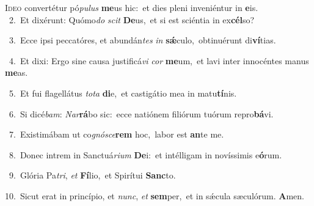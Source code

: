 \lettrine{\initial\textcolor{\initialcolor}{I}}{deo} convertétur pó\-\textit{pu}\-\textit{lus} \textbf{me}\-us hic:~\star et dies pleni inveniéntur in \textbf{e}\-is.\\
{\numbfont\textcolor{\numbcolor}{~2.}}~Et dixérunt: Quómo\textit{do} \textit{scit} \textbf{De}\-us,~\star et si est sciéntia in ex\-\textbf{cél}\-so?\par
{\numbfont\textcolor{\numbcolor}{~3.}}~Ecce ipsi peccatóres, et abundán\textit{tes} \textit{in} \textbf{sǽ}\-culo,~\star obtinuérunt di\-\textbf{ví}\-tias.\par
{\numbfont\textcolor{\numbcolor}{~4.}}~Et dixi: Ergo sine causa justificá\textit{vi} \textit{cor} \textbf{me}\-um,~\star et lavi inter innocéntes manus \textbf{me}\-as.\par
{\numbfont\textcolor{\numbcolor}{~5.}}~Et fui flagellátus \textit{to}\-\textit{ta} \textbf{di}\-e,~\star et castigátio mea in matu\-\textbf{tí}\-nis.\par
{\numbfont\textcolor{\numbcolor}{~6.}}~Si dicé\-\textit{bam}\-: \textit{Nar}\-\textbf{rá}bo sic:~\star ecce natiónem filiórum tuórum repro\-\textbf{bá}\-vi.\par
{\numbfont\textcolor{\numbcolor}{~7.}}~Existimábam ut co\-\textit{gnó}\-\textit{sce}\textbf{rem} hoc,~\star labor est \textbf{an}\-te me.\par
{\numbfont\textcolor{\numbcolor}{~8.}}~Donec intrem in Sanctuá\-\textit{ri}\-\textit{um} \textbf{De}\-i:~\star et intélligam in novíssimis e\-\textbf{ó}\-rum.\par
{\numbfont\textcolor{\numbcolor}{~9.}}~Glória Pa\-\textit{tri}\-, \textit{et} \textbf{Fí}\-lio,~\star et Spirítui \textbf{Sanc}\-to.\par
{\numbfont\textcolor{\numbcolor}{10.}}~Sicut erat in princípio, et \textit{nunc}\-, \textit{et} \textbf{sem}\-per,~\star et in sǽcula sæculórum. \textbf{A}\-men.\par
